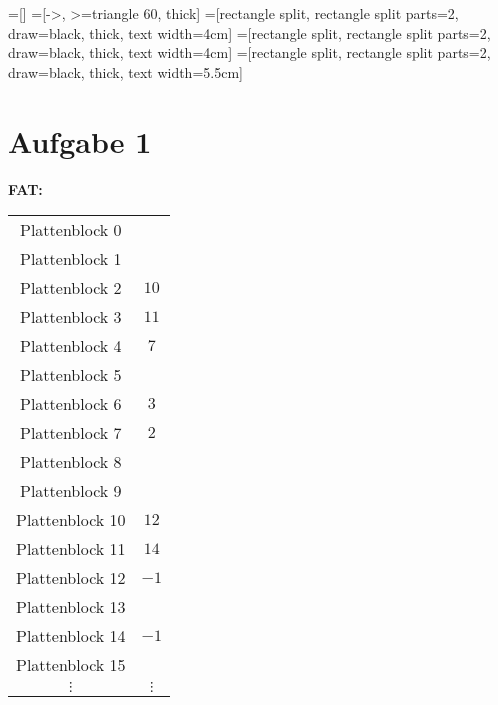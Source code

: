 \documentclass{scrartcl}
\begin{document}
=[]
=[->, >=triangle 60, thick]
=[rectangle split, rectangle split parts=2, draw=black, thick, text width=4cm]
=[rectangle split, rectangle split parts=2, draw=black, thick, text width=4cm]
=[rectangle split, rectangle split parts=2, draw=black, thick, text width=5.5cm]


\section*{Aufgabe 1}
\begin{minipage}[t]{0.4\columnwidth}%
  \vspace{1cm}
  \textbf{FAT:}

  \begin{tabular}{c|c|}
    \cline{2-2}
    Plattenblock  0 &      \\\cline{2-2}
    Plattenblock  1 &      \\\cline{2-2}
    Plattenblock  2 & $10$ \\\cline{2-2}
    Plattenblock  3 & $11$ \\\cline{2-2}
    Plattenblock  4 & $ 7$ \\\cline{2-2}
    Plattenblock  5 &      \\\cline{2-2}
    Plattenblock  6 & $ 3$ \\\cline{2-2}
    Plattenblock  7 & $ 2$ \\\cline{2-2}
    Plattenblock  8 &      \\\cline{2-2}
    Plattenblock  9 &      \\\cline{2-2}
    Plattenblock 10 & $12$ \\\cline{2-2}
    Plattenblock 11 & $14$ \\\cline{2-2}
    Plattenblock 12 & $-1$ \\\cline{2-2}
    Plattenblock 13 &      \\\cline{2-2}
    Plattenblock 14 & $-1$ \\\cline{2-2}
    Plattenblock 15 &      \\\cline{2-2}
    $\vdots$        & $\vdots$\\
  \end{tabular}%
  \vspace{1cm}
\end{minipage}%
%
\end{document}

